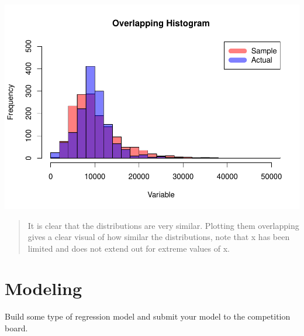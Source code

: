 \documentclass[]{article}
\newenvironment{Shaded}{\begin{snugshade}}{\end{snugshade}}
\newcommand{\KeywordTok}[1]{\textcolor[rgb]{0.13,0.29,0.53}{\textbf{{#1}}}}
\newcommand{\DataTypeTok}[1]{\textcolor[rgb]{0.13,0.29,0.53}{{#1}}}
\newcommand{\StringTok}[1]{\textcolor[rgb]{0.31,0.60,0.02}{{#1}}}
\newcommand{\NormalTok}[1]{{#1}}
\begin{document}
\includegraphics{Final_Project_files/figure-latex/unnamed-chunk-18-1.pdf}

\begin{quote}
It is clear that the distributions are very similar. Plotting them
overlapping gives a clear visual of how similar the distributions, note
that x has been limited and does not extend out for extreme values of x.
\end{quote}

\section{Modeling}\label{modeling}

Build some type of regression model and submit your model to the
competition board.

\begin{Shaded}
\end{Shaded}
\end{document}
